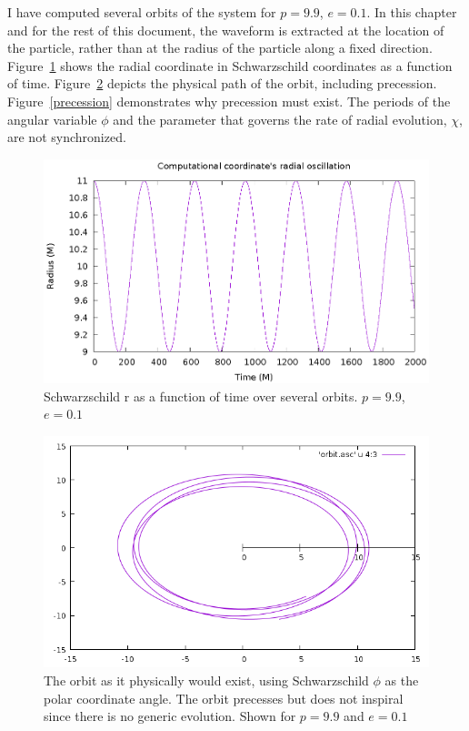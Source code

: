 I have computed several orbits of the system for $p=9.9$, $e=0.1$. In this chapter and for the rest of this document, the waveform is extracted at the location of the particle, rather than at the radius of the particle along a fixed direction. Figure~\ref{rorb} shows the radial coordinate in Schwarzschild coordinates as a function of time. Figure~\ref{phiorb} depicts the physical path of the orbit, including precession. Figure~\ref{precession} demonstrates why precession must exist. The periods of the angular variable $\phi$ and the parameter that governs the rate of radial evolution, $\chi$, are not synchronized.

\begin{figure}
  \includegraphics{orbit}
  \caption{Schwarzschild r as a function of time over several orbits. $p=9.9$, $e=0.1$}
  \label{rorb}
\end{figure}


\begin{figure}
  \includegraphics{orbitevolvedg44p99e01}
  \caption{The orbit as it physically would exist, using Schwarzschild $\phi$ as the polar coordinate angle. The orbit precesses but does not inspiral since there is no generic evolution. Shown for $p=9.9$ and $e=0.1$}
  \label{phiorb}
\end{figure}



